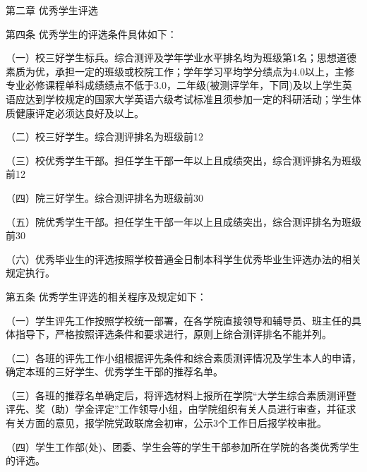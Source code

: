 \documentclass[UTF8,12pt,a4paper]{report}
\begin{document}
第二章  优秀学生评选

第四条  优秀学生的评选条件具体如下：

（一）校三好学生标兵。综合测评及学年学业水平排名均为班级第1名；思想道德素质为优，承担一定的班级或校院工作；学年学习平均学分绩点为4.0以上，主修专业必修课程单科成绩绩点不低于3.0，二年级(被测评学年，下同)及以上学生英语应达到学校规定的国家大学英语六级考试标准且须参加一定的科研活动；学生体质健康评定必须达良好及以上。

（二）校三好学生。综合测评排名为班级前12%

（三）校优秀学生干部。担任学生干部一年以上且成绩突出，综合测评排名为班级前12%

（四）院三好学生。综合测评排名为班级前30%

（五）院优秀学生干部。担任学生干部一年以上且成绩突出，综合测评排名为班级前30%

（六）优秀毕业生的评选按照学校普通全日制本科学生优秀毕业生评选办法的相关规定执行。

第五条  优秀学生评选的相关程序及规定如下：

（一）学生评先工作按照学校统一部署，在各学院直接领导和辅导员、班主任的具体指导下，严格按照评选条件和要求进行，原则上综合测评排名不能并列。

（二）各班的评先工作小组根据评先条件和综合素质测评情况及学生本人的申请，确定本班的三好学生、优秀学生干部的推荐名单。

（三）各班的推荐名单确定后，将评选材料上报所在学院“大学生综合素质测评暨评先、奖（助）学金评定”工作领导小组，由学院组织有关人员进行审查，并征求有关方面的意见，报学院党政联席会初审，公示3个工作日后报学校审批。

（四）学生工作部(处)、团委、学生会等的学生干部参加所在学院的各类优秀学生的评选。
\end{document}
